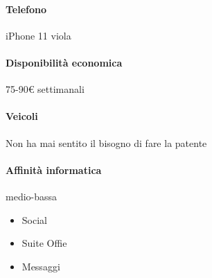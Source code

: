 \documentclass[../../UUX_Personas.tex]{subfiles}
\begin{document}
	\paragraph{Telefono} iPhone 11 viola
	\paragraph{Disponibilità economica} 75-90€ settimanali
	\paragraph{Veicoli} Non ha mai sentito il bisogno di fare la patente
	\paragraph{Affinità informatica} medio-bassa
	\begin{itemize}
		\item Social
		\item Suite Offie
		\item Messaggi
	\end{itemize}
\end{document}
